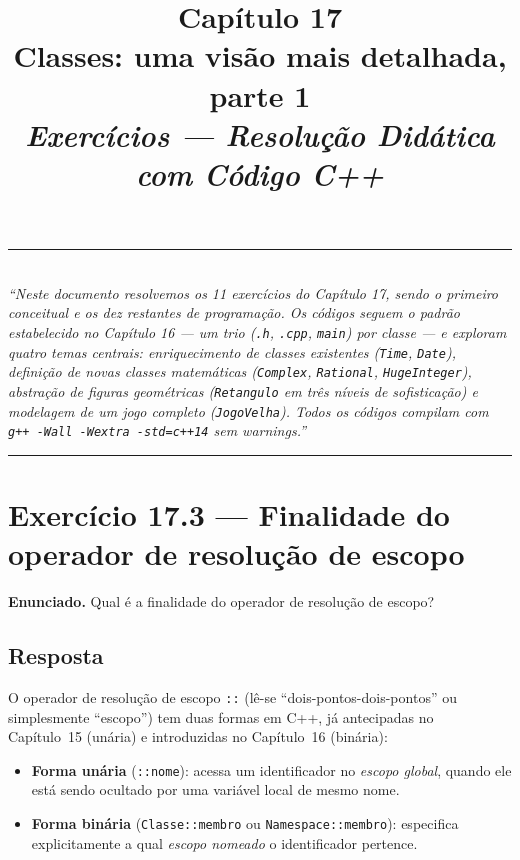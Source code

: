 \documentclass[11pt,a4paper]{article}
\title{
  \vspace{-1cm}
  {\Huge\bfseries\color{deitelblue} Cap\'itulo 17}\\[0.3em]
  {\Large\bfseries Classes: uma vis\~ao mais detalhada, parte 1}\\[0.8em]
  {\large\itshape Exerc\'icios --- Resolu\c{c}\~ao Did\'atica com C\'odigo C++}
}
\author{}
\date{}
\begin{document}
\maketitle
\thispagestyle{empty}
\vspace{-2em}

\begin{center}
\rule{0.85\textwidth}{0.5pt}\\[0.4em]
\textit{``Neste documento resolvemos os 11 exerc\'icios do Cap\'itulo 17, sendo o primeiro conceitual e os dez restantes de programa\c{c}\~ao. Os c\'odigos seguem o padr\~ao estabelecido no Cap\'itulo 16 --- um trio (\texttt{.h}, \texttt{.cpp}, \texttt{main}) por classe --- e exploram quatro temas centrais: enriquecimento de classes existentes (\texttt{Time}, \texttt{Date}), defini\c{c}\~ao de novas classes matem\'aticas (\texttt{Complex}, \texttt{Rational}, \texttt{HugeInteger}), abstra\c{c}\~ao de figuras geom\'etricas (\texttt{Retangulo} em tr\^es n\'iveis de sofistica\c{c}\~ao) e modelagem de um jogo completo (\texttt{JogoVelha}). Todos os c\'odigos compilam com \texttt{g++ -Wall -Wextra -std=c++14} sem warnings.''}\\[0.4em]
\rule{0.85\textwidth}{0.5pt}
\end{center}

\vspace{1em}

\section{Exerc\'icio 17.3 --- Finalidade do operador de resolu\c{c}\~ao de escopo}

\begin{enunciado}
\textbf{Enunciado.} Qual \'e a finalidade do operador de resolu\c{c}\~ao de escopo?
\end{enunciado}

\subsection*{Resposta}

O operador de resolu\c{c}\~ao de escopo \texttt{::} (l\^e-se ``dois-pontos-dois-pontos'' ou simplesmente ``escopo'') tem duas formas em C++, j\'a antecipadas no Cap\'itulo~15 (un\'aria) e introduzidas no Cap\'itulo~16 (bin\'aria):

\begin{itemize}[leftmargin=*]
  \item \textbf{Forma un\'aria} (\texttt{::nome}): acessa um identificador no \emph{escopo global}, quando ele est\'a sendo ocultado por uma vari\'avel local de mesmo nome.
  \item \textbf{Forma bin\'aria} (\texttt{Classe::membro} ou \texttt{Namespace::membro}): especifica explicitamente a qual \emph{escopo nomeado} o identificador pertence.
\end{itemize}
\end{document}
